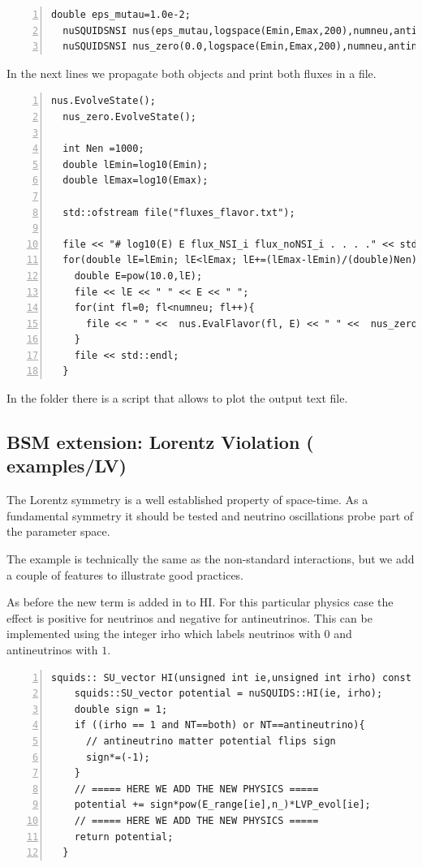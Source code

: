 \documentclass[3p,12pt]{elsarticle}
\newcommand{\ttf}{\ttfamily}
\begin{document}
\begin{lstlisting}[frame=leftline, numbers =
  left,breaklines=true,label = ex:sin1,firstnumber=last]
  double eps_mutau=1.0e-2;
  nuSQUIDSNSI nus(eps_mutau,logspace(Emin,Emax,200),numneu,antineutrino,false);
  nuSQUIDSNSI nus_zero(0.0,logspace(Emin,Emax,200),numneu,antineutrino,false);
\end{lstlisting}

In the next lines we propagate both objects and print both
fluxes in a file.

\begin{lstlisting}[frame=leftline, numbers =
  left,breaklines=true,label = ex:sin1,firstnumber=last]
  nus.EvolveState();
  nus_zero.EvolveState();

  int Nen =1000;
  double lEmin=log10(Emin);
  double lEmax=log10(Emax);
  
  std::ofstream file("fluxes_flavor.txt");

  file << "# log10(E) E flux_NSI_i flux_noNSI_i . . . ." << std::endl;
  for(double lE=lEmin; lE<lEmax; lE+=(lEmax-lEmin)/(double)Nen){
    double E=pow(10.0,lE);
    file << lE << " " << E << " ";
    for(int fl=0; fl<numneu; fl++){
      file << " " <<  nus.EvalFlavor(fl, E) << " " <<  nus_zero.EvalFlavor(fl, E);
    }
    file << std::endl;
  }
\end{lstlisting}

In the folder there is a script that allows to plot the output text
file.


\subsection{BSM extension: Lorentz Violation \textnormal{({\ttf
      examples/LV})}}
\label{sec:LV}
The Lorentz symmetry is a well established property of space-time.
As a fundamental symmetry it should be tested and neutrino
oscillations probe part of the parameter space.

The example is technically the same as the non-standard interactions,
but we add a couple of features to illustrate good practices.

As before the new term is added in to {\ttf HI}. For this particular
physics case the effect is positive for neutrinos and negative for
antineutrinos. This can be implemented using the integer {\ttf irho}
which labels neutrinos with $0$ and antineutrinos with $1$.

\begin{lstlisting}[frame=leftline, numbers =
  left,breaklines=true,label = ex:sin1,firstnumber=last]
  squids:: SU_vector HI(unsigned int ie,unsigned int irho) const {
    squids::SU_vector potential = nuSQUIDS::HI(ie, irho);
    double sign = 1;
    if ((irho == 1 and NT==both) or NT==antineutrino){
      // antineutrino matter potential flips sign
      sign*=(-1);
    }
    // ===== HERE WE ADD THE NEW PHYSICS =====
    potential += sign*pow(E_range[ie],n_)*LVP_evol[ie]; 
    // ===== HERE WE ADD THE NEW PHYSICS =====
    return potential;
  }
\end{lstlisting}
\end{document}
